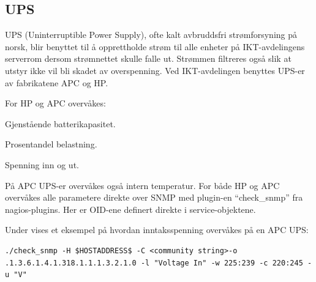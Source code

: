 \subsection{UPS}
UPS (Uninterruptible Power Supply), ofte kalt avbruddsfri strømforsyning på norsk, blir benyttet til å opprettholde strøm til alle enheter på IKT-avdelingens serverrom dersom strømnettet skulle falle ut. Strømmen filtreres også slik at utstyr ikke vil bli skadet av overspenning. Ved IKT-avdelingen benyttes UPS-er av fabrikatene APC og HP.

For HP og APC overvåkes:
\begin{itemize*}
 	\item Gjenstående batterikapasitet.
	\item Prosentandel belastning.
	\item Spenning inn og ut.
\end{itemize*}
På APC UPS-er overvåkes også intern temperatur. For både HP og APC overvåkes alle parametere direkte over SNMP med plugin-en ``check\_snmp'' fra nagios-plugins. Her er OID-ene definert direkte i service-objektene.

Under vises et eksempel på hvordan inntaksspenning overvåkes på en APC UPS:
\begin{lstlisting}[style=example]
./check_snmp -H $HOSTADDRESS$ -C <community string>-o .1.3.6.1.4.1.318.1.1.1.3.2.1.0 -l "Voltage In" -w 225:239 -c 220:245 -u "V"
\end{lstlisting}
